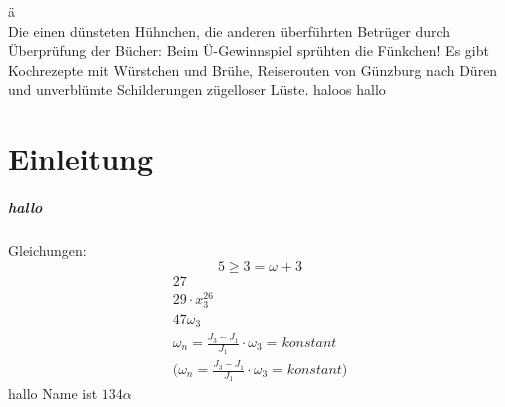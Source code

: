 \documentclass[paper=a4,bibliography=totoc,BCOR=10mm,twoside,numbers=noenddot,fontsize=11pt]{article}
\begin{document}
\"a \\
Die einen dünsteten Hühnchen, die anderen überführten Betrüger durch Überprüfung der Bücher: Beim Ü-Gewinnspiel sprühten die Fünkchen! Es gibt Kochrezepte mit Würstchen und Brühe, Reiserouten von Günzburg nach Düren und unverblümte Schilderungen zügelloser Lüste.
haloos hallo

\section{Einleitung}
\subparagraph{hallo}



Gleichungen:
\begin{equation}
5\geq3=\omega+3
\end{equation}
\begin{align}
27\\
29 \cdot x^{26}_3\\
47 \omega_3\\
\omega_n = \frac{J_3 - J_1}{J_1} \cdot \omega_3 = konstant\\
\Biggl( \omega_n = \frac{J_3 - J_1}{J_1} \cdot \omega_3 = konstant \Biggr)
\end{align}
hallo Name ist $134\alpha$
\end{document}
